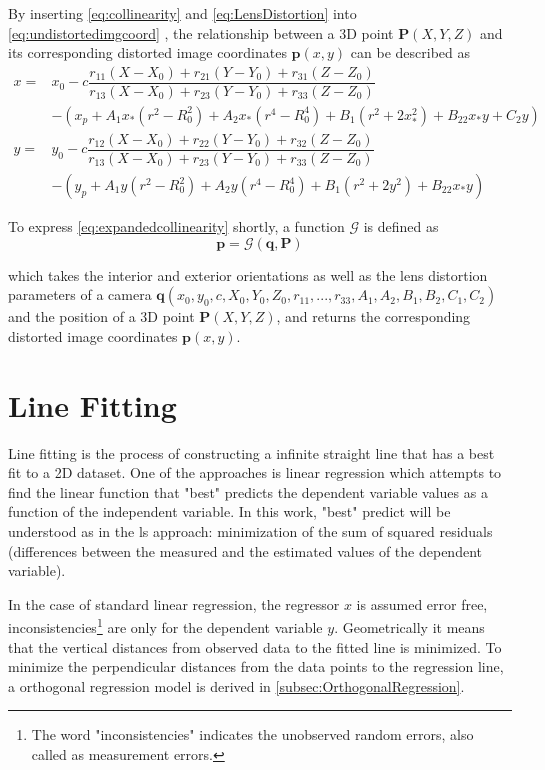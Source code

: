 By inserting \eqref{eq:collinearity} and \eqref{eq:LensDistortion} into \eqref{eq:undistortedimgcoord} , the relationship between a 3D point $\mathbf{P}(X, Y, Z)$ and its corresponding distorted image coordinates $\mathbf{p}(x,y)$ can be described as
\begin{equation} \label{eq:expandedcollinearity}
\begin{split}
x =& x_0-c\dfrac{r_{11}(X-X_0)+r_{21}(Y-Y_0)+r_{31}(Z-Z_0)}{r_{13}(X-X_0)+r_{23}(Y-Y_0)+r_{33}(Z-Z_0)} \\
&-(x_p + A_1x_*(r^2-R_0^2) + A_2x_*(r^4-R_0^4) + B_1(r^2+2x_*^2) + B_22x_*y+C_2y)\\
y =& y_0-c\dfrac{r_{12}(X-X_0)+r_{22}(Y-Y_0)+r_{32}(Z-Z_0)}{r_{13}(X-X_0)+r_{23}(Y-Y_0)+r_{33}(Z-Z_0)} \\
&-(y_p + A_1y  (r^2-R_0^2) + A_2y  (r^4-R_0^4) + B_1(r^2+2y^2)   + B_22x_*y)
\end{split}
\end{equation}

To express \eqref{eq:expandedcollinearity} shortly, a function $\mathcal{G}$ is defined as
\begin{equation} \label{eq:Gfunction}
\mathbf{p} = \mathcal{G}(\mathbf{q},\mathbf{P}) 
\end{equation}

which takes the interior and exterior orientations as well as the lens distortion parameters of a camera $\mathbf{q}(x_0,y_0,c,X_0,Y_0,Z_0,r_{11},...,r_{33},A_1,A_2,B_1,B_2,C_1,C_2)$ and the position of a 3D point $\mathbf{P}(X, Y, Z)$, and returns the corresponding distorted image coordinates $\mathbf{p}(x,y)$.

\clearpage
\section{Line Fitting}
\label{sec:LineFitting}

Line fitting is the process of constructing a infinite straight line that has a best fit to a 2D dataset. One of the approaches is linear regression which attempts to find the linear function that "best" predicts the dependent variable values as a function of the independent variable. In this work, "best" predict will be understood as in the \gls{ls} approach: minimization of the sum of squared residuals (differences between the measured and the estimated values of the dependent variable).

In the case of standard linear regression, the regressor $x$ is assumed error free, inconsistencies\footnote{The word "inconsistencies" indicates the unobserved random errors, also called as measurement errors.} are only for the dependent variable $y$. Geometrically it means that the vertical distances from observed data to the fitted line is minimized. To minimize the perpendicular distances from the data points to the regression line, a orthogonal regression model is derived in \cref{subsec:OrthogonalRegression}.

